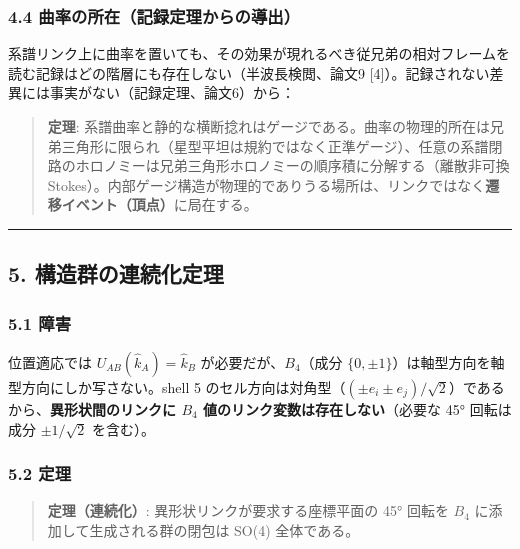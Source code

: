 \documentclass[
]{ltjsarticle}
\begin{document}
\subsubsection{4.4
曲率の所在（記録定理からの導出）}\label{ux66f2ux7387ux306eux6240ux5728ux8a18ux9332ux5b9aux7406ux304bux3089ux306eux5c0eux51fa}

系譜リンク上に曲率を置いても、その効果が現れるべき従兄弟の相対フレームを読む記録はどの階層にも存在しない（半波長検閲、論文9
{[}4{]}）。記録されない差異には事実がない（記録定理、論文6）から：

\begin{quote}
\textbf{定理}:
系譜曲率と静的な横断捻れはゲージである。曲率の物理的所在は兄弟三角形に限られ（星型平坦は規約ではなく正準ゲージ）、任意の系譜閉路のホロノミーは兄弟三角形ホロノミーの順序積に分解する（離散非可換
Stokes）。内部ゲージ構造が物理的でありうる場所は、リンクではなく\textbf{遷移イベント（頂点）}に局在する。
\end{quote}

\begin{center}\rule{0.5\linewidth}{0.5pt}\end{center}

\subsection{5.
構造群の連続化定理}\label{ux69cbux9020ux7fa4ux306eux9023ux7d9aux5316ux5b9aux7406}

\subsubsection{5.1 障害}\label{ux969cux5bb3}

位置適応では \(U_{AB}(\hat k_A)=\hat k_B\) が必要だが、\(B_4\)（成分
\(\{0,\pm1\}\)）は軸型方向を軸型方向にしか写さない。shell 5
のセル方向は対角型（\((\pm e_i\pm e_j)/\sqrt2\)）であるから、\textbf{異形状間のリンクに
\(B_4\) 値のリンク変数は存在しない}（必要な 45° 回転は成分
\(\pm1/\sqrt2\) を含む）。

\subsubsection{5.2 定理}\label{ux5b9aux7406}

\begin{quote}
\textbf{定理（連続化）}: 異形状リンクが要求する座標平面の 45° 回転を
\(B_4\) に添加して生成される群の閉包は SO(4) 全体である。
\end{quote}
\end{document}
